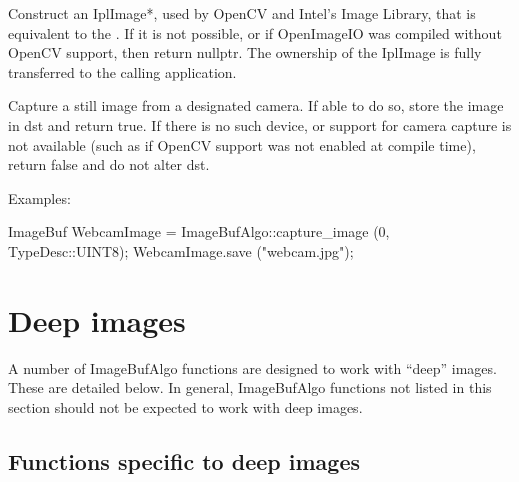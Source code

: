 \begin{comment}
\smallskip
\noindent Examples:
\begin{code}
\end{code}
\end{comment}
\apiend


 
Construct an {\cf IplImage*}, used by OpenCV and Intel's Image Library,
that is equivalent to the .  If it is not possible, or
if OpenImageIO was compiled without OpenCV support, then return
{\cf nullptr}.  The ownership of the {\cf IplImage} is fully transferred to the
calling application.

\begin{comment}
\smallskip
\noindent Examples:
\begin{code}
\end{code}
\end{comment}
\apiend


 
Capture a still image from a designated camera.  If able to do so,
store the image in {\cf dst} and return {\cf true}.  If there is no such device,
or support for camera capture is not available (such as if OpenCV
support was not enabled at compile time), return {\cf false} and do not
alter {\cf dst}.

\smallskip
\noindent Examples:
\begin{code}
    ImageBuf WebcamImage = ImageBufAlgo::capture_image (0, TypeDesc::UINT8);
    WebcamImage.save ("webcam.jpg");
\end{code}
\apiend



\section{Deep images}
\label{sec:iba:deep}

A number of {\cf ImageBufAlgo} functions are designed to work with ``deep''
images. These are detailed below. In general, {\cf ImageBufAlgo} functions
not listed in this section should not be expected to work with deep images.

\subsection{Functions specific to deep images}

